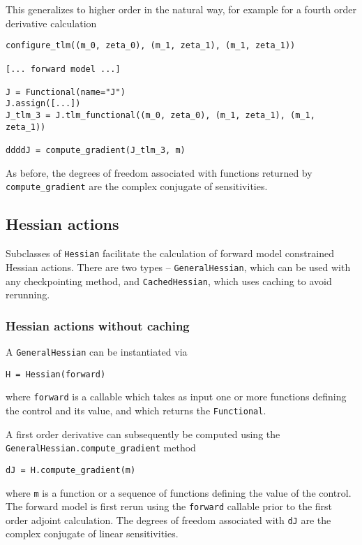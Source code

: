 \documentclass[11pt]{article}
\begin{document}
This generalizes to higher order in the natural way, for example for a fourth
order derivative calculation
\begin{lstlisting}
configure_tlm((m_0, zeta_0), (m_1, zeta_1), (m_1, zeta_1))

[... forward model ...]

J = Functional(name="J")
J.assign([...])
J_tlm_3 = J.tlm_functional((m_0, zeta_0), (m_1, zeta_1), (m_1, zeta_1))

ddddJ = compute_gradient(J_tlm_3, m)
\end{lstlisting}

As before, the degrees of freedom associated with functions returned by
\texttt{compute\_gradient} are the complex conjugate of sensitivities.

\subsection{Hessian actions}\label{sect:Hessian}

Subclasses of \texttt{Hessian} facilitate the calculation of forward model
constrained Hessian actions. There are two types -- \texttt{GeneralHessian},
which can be used with any checkpointing method, and \texttt{CachedHessian},
which uses caching to avoid rerunning.

\subsubsection{Hessian actions without caching}

A \texttt{GeneralHessian} can be instantiated via
\begin{lstlisting}
H = Hessian(forward)
\end{lstlisting}
where \texttt{forward} is a callable which takes as input one or more functions
defining the control and its value, and which returns the \texttt{Functional}.

A first order derivative can subsequently be computed using the
\texttt{GeneralHessian.compute\_gradient} method
\begin{lstlisting}
dJ = H.compute_gradient(m)
\end{lstlisting}
where \texttt{m} is a function or a sequence of functions defining the value of
the control. The forward model is first rerun using the \texttt{forward}
callable prior to the first order adjoint calculation. The degrees of
freedom associated with \texttt{dJ} are the complex conjugate of linear
sensitivities.
\end{document}
